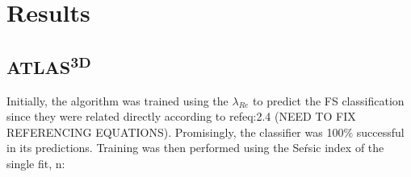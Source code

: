 \chapter{Results}

\label{ch:results}

\section{ATLAS\textsuperscript{3D}}
Initially, the algorithm was trained using the $\lambda_{Re}$ to predict the FS classification since they were related directly according to ref{eq:2.4}
(NEED TO FIX REFERENCING EQUATIONS). Promisingly, the classifier was 100\% successful in its predictions. Training was then performed using the Se\'rsic index of the single fit, n:
